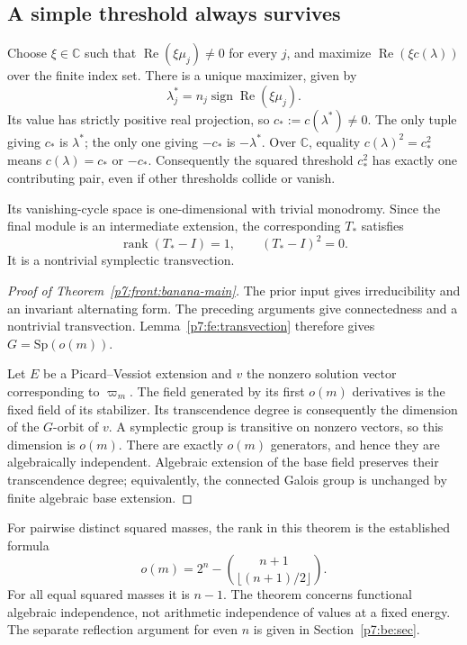 \documentclass[11pt,a4paper]{article}
\theoremstyle{definition}
\theoremstyle{remark}
\numberwithin{equation}{section}
\begin{document}
\subsection{A simple threshold always survives}

Choose $\xi\in\mathbb C$ such that
$\operatorname{Re}(\xi\mu_j)\ne0$ for every $j$, and maximize
$\operatorname{Re}(\xi c(\lambda))$ over the finite index set.
There is a unique maximizer, given by
\[
 \lambda_j^*=n_j\operatorname{sign}\operatorname{Re}(\xi\mu_j).
\]
Its value has strictly positive real projection, so
$c_*:=c(\lambda^*)\ne0$. The only tuple giving $c_*$ is
$\lambda^*$; the only one giving $-c_*$ is $-\lambda^*$.
Over $\mathbb C$, equality $c(\lambda)^2=c_*^2$ means
$c(\lambda)=c_*$ or $-c_*$. Consequently the squared threshold
$c_*^2$ has exactly one contributing pair, even if other
thresholds collide or vanish.

Its vanishing-cycle space is one-dimensional with trivial
monodromy. Since the final module is an intermediate extension,
the corresponding $T_*$ satisfies
\[
                 \operatorname{rank}(T_*-I)=1,
                 \qquad (T_*-I)^2=0.
\]
It is a nontrivial symplectic transvection.

\begin{proof}[Proof of Theorem~\ref{p7:front:banana-main}]
The prior input gives irreducibility and an invariant alternating
form. The preceding arguments give connectedness and a nontrivial
transvection. Lemma~\ref{p7:fe:transvection} therefore gives
$G=\mathrm{Sp}(o(m))$.

Let $E$ be a Picard--Vessiot extension and $v$ the nonzero solution
vector corresponding to $\varpi_m$. The field generated by its
first $o(m)$ derivatives is the fixed field of its stabilizer.
Its transcendence degree is consequently the dimension of the
$G$-orbit of $v$. A symplectic group is transitive on nonzero
vectors, so this dimension is $o(m)$. There are exactly $o(m)$
generators, and hence they are algebraically independent.
Algebraic extension of the base field preserves their transcendence
degree; equivalently, the connected Galois group is unchanged by
finite algebraic base extension.
\end{proof}

For pairwise distinct squared masses, the rank in this theorem is
the established formula
\[
 o(m)=2^n-\binom{n+1}{\lfloor(n+1)/2\rfloor}.
\]
For all equal squared masses it is $n-1$.
The theorem concerns functional algebraic independence, not
arithmetic independence of values at a fixed energy. The separate reflection argument for even $n$ is given in
Section~\ref{p7:be:sec}.
\end{document}
